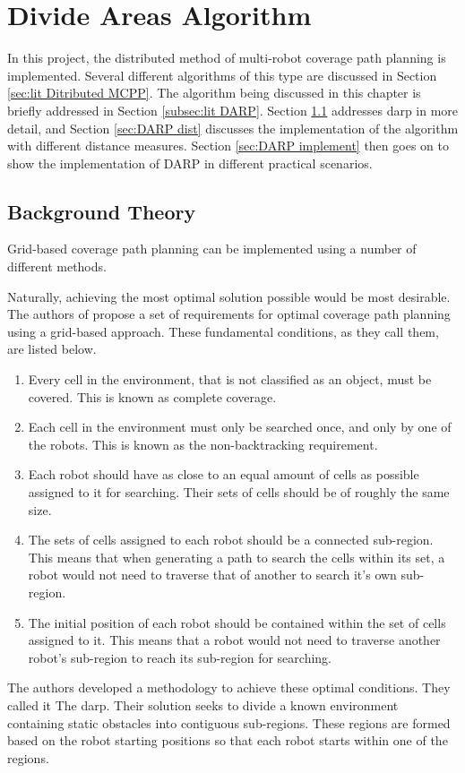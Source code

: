 \chapter{Divide Areas Algorithm}
\label{chp:DARP}
In this project, the distributed method of multi-robot coverage path planning is implemented. Several different algorithms of this type are discussed in Section \ref{sec:lit Ditributed MCPP}. The algorithm being discussed in this chapter is briefly addressed in Section \ref{subsec:lit DARP}. Section \ref{sec:DARP bg} addresses \acs{darp} in more detail, and Section \ref{sec:DARP dist} discusses the implementation of the algorithm with different distance measures. Section \ref{sec:DARP implement} then goes on to show the implementation of DARP in different practical scenarios. 
\section{Background Theory}
\label{sec:DARP bg}
Grid-based coverage path planning can be implemented using a number of different methods. %

Naturally, achieving the most optimal solution possible would be most desirable. The authors of \cite{DARP2017} propose a set of requirements for optimal coverage path planning using a grid-based approach. These fundamental conditions, as they call them, are listed below.
\begin{enumerate}
	\item Every cell in the environment, that is not classified as an object, must be covered. This is known as complete coverage.
	\item Each cell in the environment must only be searched once, and only by one of the robots. This is known as the non-backtracking requirement.
	\item Each robot should have as close to an equal amount of cells as possible assigned to it for searching. Their sets of cells should be of roughly the same size.
	\item The sets of cells assigned to each robot should be a connected sub-region. This means that when generating a path to search the cells within its set, a robot would not need to traverse that of another to search it's own sub-region.
	\item The initial position of each robot should be contained within the set of cells assigned to it. This means that a robot would not need to traverse another robot's sub-region to reach its sub-region for searching.
\end{enumerate}
The authors developed a methodology to achieve these optimal conditions. They called it The \acf{darp}. Their solution seeks to divide a known environment containing static obstacles into contiguous sub-regions. These regions are formed based on the robot starting positions so that each robot starts within one of the regions.

